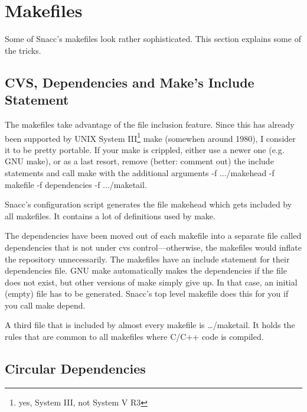 
%
%

\chapter{\label{makefile-sect}Makefiles}

Some of Snacc's makefiles look rather sophisticated.
This section explains some of the tricks.

\section{CVS, Dependencies and Make's Include Statement}

The makefiles take advantage of the file inclusion feature.
Since this has already been supported by UNIX System III\footnote{yes, System III, not System V R3} make (somewhen around 1980), I consider it to be pretty portable.
If your make is crippled, either use a newer one (e.g. GNU make), or as a last resort, remove (better: comment out) the include statements and call make with the additional arguments {\ufn -f .../makehead -f makefile -f dependencies -f .../maketail}.

Snacc's configuration script generates the file {\ufn makehead} which gets included by all makefiles.
It contains a lot of definitions used by make.

The dependencies have been moved out of each makefile into a separate file called {\ufn dependencies} that is not under cvs control---otherwise, the makefiles would inflate the repository unnecessarily.
The makefiles have an include statement for their dependencies file.
GNU make automatically makes the dependencies if the file does not exist, but other versions of {\ufn make} simply give up.
In that case, an initial (empty) file has to be generated.
Snacc's top level makefile does this for you if you call {\ufn make depend}.

A third file that is included by almost every makefile is {\ufn \dots/maketail}.
It holds the rules that are common to all makefiles where C/C++ code is compiled.

\section{Circular Dependencies}


